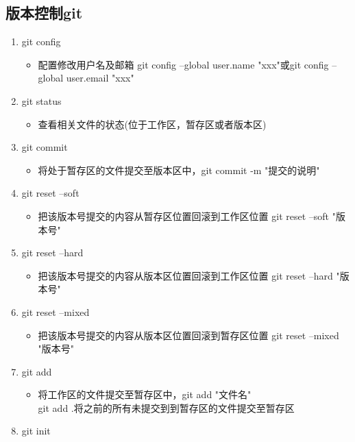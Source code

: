 \documentclass[a4paper, 12pt]{article}
\begin{document}
\subsection{版本控制git}
\begin{enumerate}
    \item {\large git config}
    \begin{itemize}
    \item{配置修改用户名及邮箱 git config --global user.name "xxx"或git config -- global user.email "xxx"}
    \end{itemize}
    \item{\large git status}
    \begin{itemize}
      \item 查看相关文件的状态(位于工作区，暂存区或者版本区)
    \end{itemize}
    \item{\large git commit}
    \begin{itemize}
      \item 将处于暂存区的文件提交至版本区中，git commit -m "提交的说明" 
    \end{itemize}
  \item{\large git reset --soft}
    \begin{itemize}
      \item 把该版本号提交的内容从暂存区位置回滚到工作区位置 git reset --soft "版本号" 
    \end{itemize}
    \item{\large git reset --hard}
    \begin{itemize}
      \item 把该版本号提交的内容从版本区位置回滚到工作区位置 git reset --hard "版本号" 
    \end{itemize}
    \item{\large git reset --mixed}
    \begin{itemize}
      \item 把该版本号提交的内容从版本区位置回滚到暂存区位置 git reset --mixed "版本号" 
    \end{itemize}
    \item{\large git add}
    \begin{itemize}
      \item 将工作区的文件提交至暂存区中，git add "文件名"\\git add .将之前的所有未提交到到暂存区的文件提交至暂存区
    \end{itemize}
    \newpage
    \item {\large git init} 
    \begin{itemize}

\end{itemize}
\end{enumerate}
\end{document}
